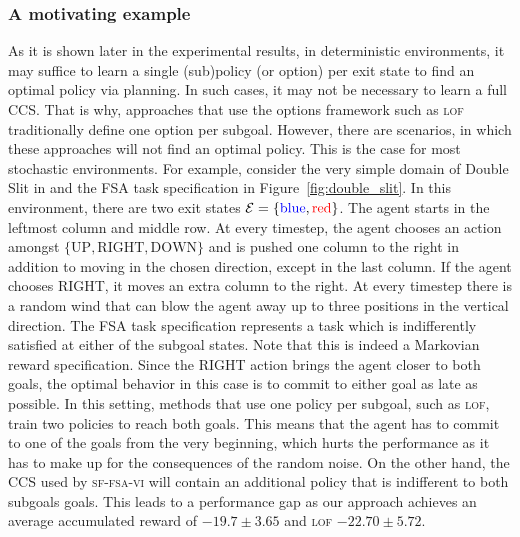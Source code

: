 \subsubsection{A motivating example} As it is shown later in the experimental results, in deterministic environments, it may suffice to learn a single (sub)policy (or option) per exit state to find an optimal policy via planning. In such cases, it may not be necessary to learn a full CCS. That is why, approaches that use the options framework such as \textsc{lof} traditionally define one option per subgoal. However, there are scenarios, in which these approaches will not find an optimal policy. This is the case for most stochastic environments. For example, consider the very simple domain of Double Slit in and the FSA task specification in Figure~\ref{fig:double_slit}. In this environment, there are two exit states $\mathcal{E}=\{{\color{blue} \text{blue}}, {\color{red}\text{red}}\}$. The agent starts in the leftmost column and middle row. At every timestep, the agent chooses an action amongst $\{\text{UP}, \text{RIGHT}, \text{DOWN}\}$ and is pushed one column to the right in addition to moving in the chosen direction, except in the last column. If the agent chooses RIGHT, it moves an extra column to the right. At every timestep there is a random wind that can blow the agent away up to three positions in the vertical direction. The FSA task specification represents a task which is indifferently satisfied at either of the subgoal states. Note that this is indeed a Markovian reward specification. Since the RIGHT action brings the agent closer to both goals, the optimal behavior in this case is to commit to either goal as late as possible. In this setting, methods that use one policy per subgoal, such as \textsc{lof}, train two policies to reach both goals. This means that the agent has to commit to one of the goals from the very beginning, which hurts the performance as it has to make up for the consequences of the random noise. On the other hand, the CCS used by \textsc{sf-fsa-vi} will contain an additional policy that is indifferent to both subgoals goals. This leads to a performance gap as our approach achieves an average accumulated reward of $-19.7\pm3.65$ and \textsc{lof} $-22.70\pm 5.72$.

